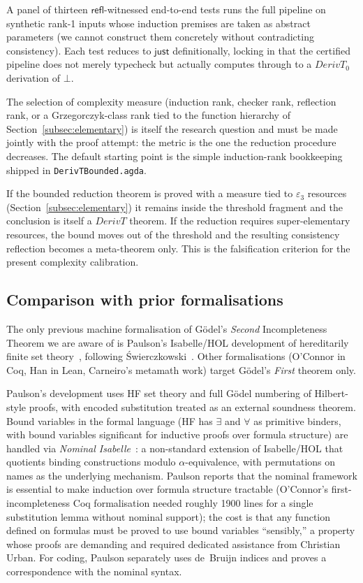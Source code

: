 \documentclass[11pt]{article}
\begin{document}
A panel of thirteen $\mathsf{refl}$-witnessed end-to-end tests runs
the full pipeline on synthetic rank-1 inputs whose induction
premises are taken as abstract parameters (we cannot construct
them concretely without contradicting consistency).  Each test
reduces to $\mathsf{just}$ definitionally, locking in that the
certified pipeline does not merely typecheck but actually computes
through to a $\mathit{DerivT}_0$ derivation of $\bot$.

The selection of complexity measure (induction rank, checker rank,
reflection rank, or a Grzegorczyk-class rank tied to the function
hierarchy of Section~\ref{subsec:elementary}) is itself the research
question and must be made jointly with the proof attempt: the metric
is the one the reduction procedure decreases.  The default starting
point is the simple induction-rank bookkeeping shipped in
\verb|DerivTBounded.agda|.

If the bounded reduction theorem is proved with a measure tied to
$\varepsilon_3$ resources (Section~\ref{subsec:elementary}) it
remains inside the threshold fragment and the conclusion is itself a
$\mathit{DerivT}$ theorem.  If the reduction requires
super-elementary resources, the bound moves out of the threshold and
the resulting consistency reflection becomes a meta-theorem only.
This is the falsification criterion for the present complexity
calibration.

\subsection{Comparison with prior formalisations}

The only previous machine formalisation of G\"odel's \emph{Second}
Incompleteness Theorem we are aware of is Paulson's Isabelle/HOL
development of hereditarily finite set theory~\cite{paulson2014},
following \'{S}wierczkowski~\cite{swierczkowski2003}.  Other
formalisations (O'Connor in Coq, Han in Lean, Carneiro's metamath
work) target G\"odel's \emph{First} theorem only.

Paulson's development uses HF set theory and full G\"odel numbering of
Hilbert-style proofs, with encoded substitution treated as an external
soundness theorem.  Bound variables in the formal language (HF has
$\exists$ and $\forall$ as primitive binders, with bound variables
significant for inductive proofs over formula structure) are handled
via \emph{Nominal Isabelle}~\cite{urbankaliszyk2012}: a non-standard
extension of Isabelle/HOL that quotients binding constructions
modulo $\alpha$-equivalence, with permutations on names as the
underlying mechanism.  Paulson reports that the nominal framework
is essential to make induction over formula structure tractable
(O'Connor's first-incompleteness Coq formalisation needed roughly
1900 lines for a single substitution lemma without nominal support);
the cost is that any function defined on formulas must be proved to
use bound variables ``sensibly,'' a property whose proofs are
demanding and required dedicated assistance from Christian Urban.
For coding, Paulson separately uses de~Bruijn indices and proves a
correspondence with the nominal syntax.
\end{document}
